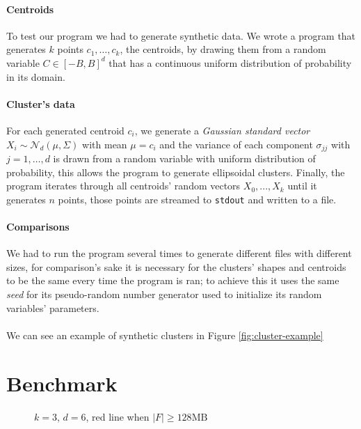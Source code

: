 \documentclass[parskip=full]{report}
\begin{document}
\paragraph{Centroids}
To test our program we had to generate synthetic data. We wrote a program that 
generates $k$ points $c_1, \dots, c_k$, the centroids, by drawing them from a 
random variable 
$C \in \left[-B,B\right]^d$ that has a continuous uniform distribution of 
probability in its domain. 

\paragraph{Cluster's data}
For each generated centroid $c_i$, we generate a \emph{Gaussian standard 
vector} $X_i \sim \mathcal{N}_d(\mu, \Sigma)$ with mean $\mu = c_i$ and the 
variance of each component 
$\sigma_{jj}$ with $j = 1, \dots, d$ is 
drawn from a random variable with uniform distribution of probability, this 
allows the program to generate ellipsoidal clusters. Finally, the program 
iterates through all centroids' random vectors $X_0, ..., X_k$ until it 
generates $n$ points, those points are streamed to \texttt{stdout} and written 
to a file.

\paragraph{Comparisons}
We had to run the program several times to generate different files with 
different sizes, for comparison's sake it is necessary for the clusters' shapes 
and centroids to be the same every time the program is ran; to achieve this it 
uses the same  \emph{seed} for its pseudo-random number generator used to 
initialize its random variables' parameters.

\paragraph{}
We can see an example of synthetic clusters in Figure \ref{fig:cluster-example}

\section{Benchmark}

\begin{figure}[H]
	\centering
	\caption{$k=3$, $d=6$, red line when $|F| \ge 128\text{MB}$}
\end{figure}
\end{document}
